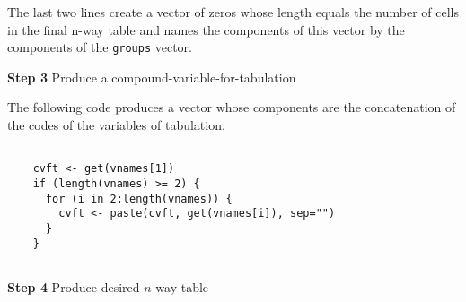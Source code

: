 The last two lines create a vector of zeros whose length equals the
number of cells in the final n-way table and names the components of
this vector by the components of the \texttt{groups} vector.


%
%
%
%
%
%
%
%
%
%

\vspace{12pt}
{\bf Step 3} Produce a compound-variable-for-tabulation

The following code produces a vector whose components are the concatenation of the codes of the variables of tabulation.

\begin{verbatim}

    cvft <- get(vnames[1])
    if (length(vnames) >= 2) {
      for (i in 2:length(vnames)) {
        cvft <- paste(cvft, get(vnames[i]), sep="")
      }
    }
	
\end{verbatim}


\vspace{12pt}
{\bf Step 4} Produce desired $n$-way table

